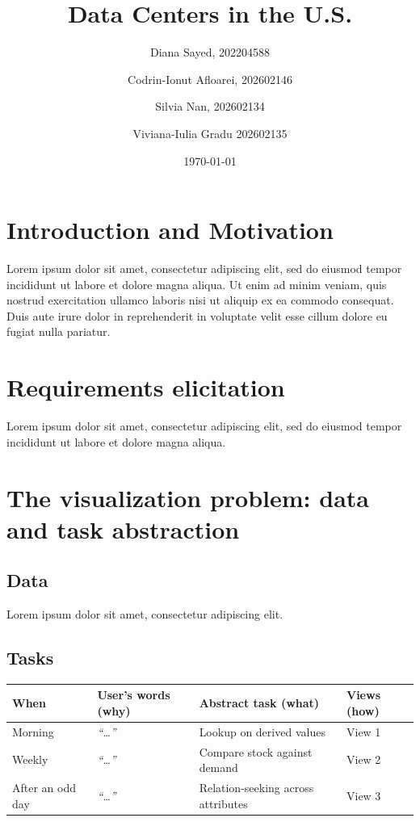 \documentclass{aureport}
\title{Data \: Centers \: in \: the \: U.S.}
\author{Diana Sayed, 202204588 \and Codrin-Ionut Afloarei, 202602146 \and Silvia Nan, 202602134 \and Viviana-Iulia Gradu 202602135}
\affiliation{Department of Computer Science, Aarhus University}
\date{\today}
\begin{document}
\makecover

\section{Introduction and Motivation}
Lorem ipsum dolor sit amet, consectetur adipiscing elit, sed do eiusmod tempor incididunt ut labore et dolore magna aliqua. Ut enim ad minim veniam, quis nostrud exercitation ullamco laboris nisi ut aliquip ex ea commodo consequat. Duis aute irure dolor in reprehenderit in voluptate velit esse cillum dolore eu fugiat nulla pariatur.

\section{Requirements elicitation}
Lorem ipsum dolor sit amet, consectetur adipiscing elit, sed do eiusmod tempor incididunt ut labore et dolore magna aliqua.

\section{The visualization problem: data and task abstraction}
\subsection{Data}
Lorem ipsum dolor sit amet, consectetur adipiscing elit.

\subsection{Tasks}
\begin{table}[h]
  \small
  \begin{tabularx}{\linewidth}{@{}l Y Y Y@{}}
    \toprule
    \textbf{When} & \textbf{User's words (why)} & \textbf{Abstract task (what)} & \textbf{Views (how)} \\
    \midrule
    Morning          & \emph{``\ldots''} & Lookup on derived values            & View 1 \\
    Weekly           & \emph{``\ldots''} & Compare stock against demand         & View 2 \\
    After an odd day & \emph{``\ldots''} & Relation-seeking across attributes   & View 3 \\
    \bottomrule
  \end{tabularx}
\end{table}
\end{document}
